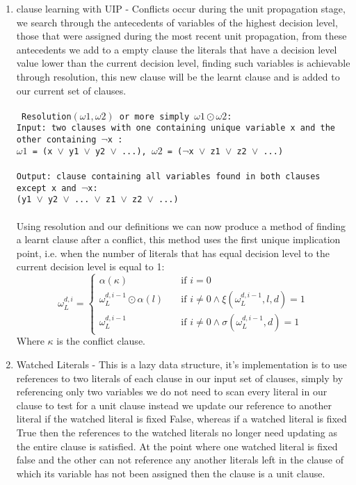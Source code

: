 \documentclass[12pt,a4paper]{article}
\begin{document}
\begin{enumerate}
\item{clause learning with UIP \cite{GRASP} - Conflicts occur during the unit propagation stage, we search through the antecedents of variables of the highest decision level, those that were assigned during the most recent unit propagation, from these antecedents we add to a empty clause the literals that have a decision level value lower than the current decision level, finding such variables is achievable through resolution, this new clause will be the learnt clause and is added to our current set of clauses.\\\\
\texttt{
Resolution$(\omega1, \omega2)$ or more simply $\omega1\odot\omega2$: \\
Input: two clauses with one containing unique variable x and the other containing $\neg$x :\\ \hspace*{1cm} $\omega1$ = (x $\lor$ y1  $\lor$ y2 $\lor$ ...), $\omega2$ = ($\neg$x $\lor$ z1 $\lor$ z2 $\lor$ ...)\\\\
Output: clause containing all variables found in both clauses except x and $\neg$x:\\ \hspace*{2.5cm} (y1  $\lor$ y2 $\lor$ ... $\lor$ z1 $\lor$ z2 $\lor$ ...)
}\\\\
Using resolution and our definitions we can now produce a method of finding a learnt clause after a conflict, this method uses the first unique implication point, i.e. when the number of literals that has equal decision level to the current decision level is equal to 1:\\
\[ \omega_L ^{d, i} = 
  \begin{cases}
    \alpha(\kappa) & \quad \text{if } i = 0\\
    \omega_L ^{d, i-1} \odot \alpha(l) & \quad \text{if } i \neq 0 \land \xi(\omega_L ^{d, i-1}, l, d) = 1\\
     \omega_L ^{d, i-1} & \quad \text{if } i \neq 0 \land \sigma(\omega_L ^{d, i-1}, d) = 1
  \end{cases}
\]
Where $\kappa$ is the conflict clause.
}
\item{Watched Literals \cite{chaff}- This is a lazy data structure, it's implementation is to use references to two literals of each clause in our input set of clauses, simply by referencing only two variables we do not need to scan every literal in our clause to test for a unit clause instead we update our reference to another literal if the watched literal is fixed False, whereas if a watched literal is fixed True then the references to the watched literals no longer need updating as the entire clause is satisfied. At the point where one watched literal is fixed false and the other can not reference any another literals left in the clause of which its variable has not been assigned then the clause is a unit clause.\\
}
\end{enumerate}
\end{document}
